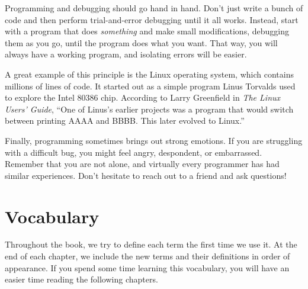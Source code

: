 Programming and debugging should go hand in hand.
Don't just write a bunch of code and then perform trial-and-error debugging until it all works.
Instead, start with a program that does {\em something} and make small modifications, debugging them as you go, until the program does what you want.
That way, you will always have a working program, and isolating errors will be easier.


A great example of this principle is the Linux operating system, which contains millions of lines of code.
It started out as a simple program Linus Torvalds used to explore the Intel 80386 chip.
According to Larry Greenfield in {\it The Linux Users' Guide}, ``One of Linus's earlier projects was a program that would switch between printing AAAA and BBBB.
This later evolved to Linux.''


Finally, programming sometimes brings out strong emotions.
If you are struggling with a difficult bug, you might feel angry, despondent, or embarrassed.
Remember that you are not alone, and virtually every programmer has had similar experiences.
Don't hesitate to reach out to a friend and ask questions!


\section{Vocabulary}

Throughout the book, we try to define each term the first time we use it.
At the end of each chapter, we include the new terms and their definitions in order of appearance.
If you spend some time learning this vocabulary, you will have an easier time reading the following chapters.

